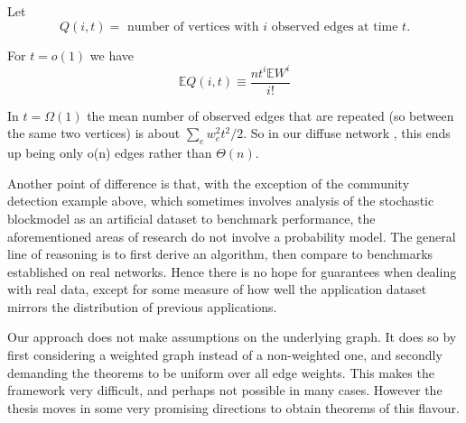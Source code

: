 Let $$Q(i,t) = \text{ number of vertices with $i$ observed edges at time $t$}. $$

For $t = o(1)$ we have $$ \mathbb{E}Q(i,t) \equiv \frac{nt^i\mathbb{E} W^i}{i!}$$

In $t = \Omega(1)$ the mean number of observed edges that are repeated (so between the same two vertices) is about $\sum_ew_e^2t^2/2$.  So in our diffuse network , this ends up being only o(n) edges rather than $\Theta(n)$.  

Another point of difference is that, with the exception of the community detection example above, which sometimes involves analysis of the stochastic blockmodel as an artificial dataset to benchmark performance, the aforementioned areas of research do not involve a probability model.  The general line of reasoning is to first derive an algorithm, then compare to benchmarks established on real networks. Hence there is no hope for guarantees when dealing with real data, except for some measure of how well the application dataset mirrors the distribution of previous applications.

Our approach does not make assumptions on the underlying graph. It does so by first considering a weighted graph instead of a non-weighted one, and secondly demanding the theorems to be uniform over all edge weights.  This makes the framework very difficult, and perhaps not possible in many cases.  However the thesis moves in some very promising directions to obtain theorems of this flavour.  




